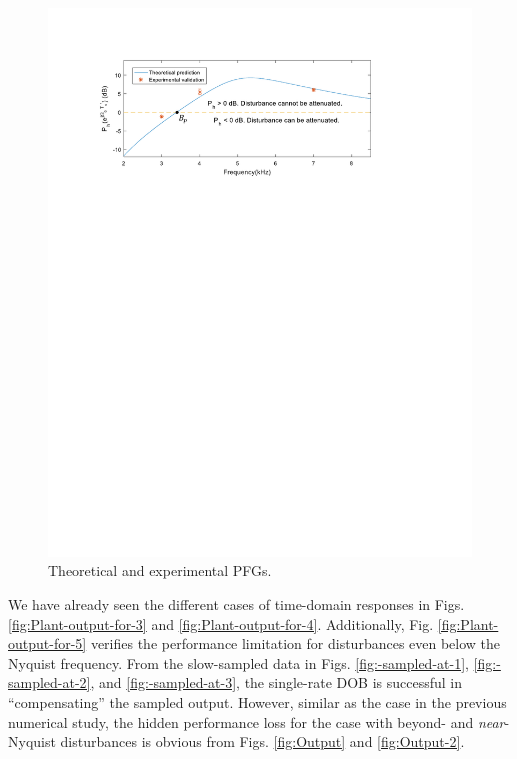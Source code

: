 \documentclass [11pt, proquest] {uwthesis}[2020/02/24]
\begin{document}
\begin{figure}[!ht]
\begin{centering}
\includegraphics[width=13cm]{Spectral-analysis/FIG17.pdf}
\par\end{centering}
\caption{\label{fig:Theoretical-and-experimental}Theoretical and experimental
PFGs.}
\end{figure}

We have already seen the different cases of time-domain responses
in Figs. \ref{fig:Plant-output-for-3} and \ref{fig:Plant-output-for-4}.
Additionally, Fig. \ref{fig:Plant-output-for-5} verifies the performance
limitation for disturbances even below the Nyquist frequency. From
the slow-sampled data in Figs. \ref{fig:-sampled-at-1}, \ref{fig:-sampled-at-2},
and \ref{fig:-sampled-at-3}, the single-rate DOB is successful in
``compensating'' the sampled output. However, similar as the case
in the previous numerical study, the hidden performance loss for the
case with beyond- and \emph{near}-Nyquist disturbances is obvious
from Figs. \ref{fig:Output} and \ref{fig:Output-2}.
\end{document}
